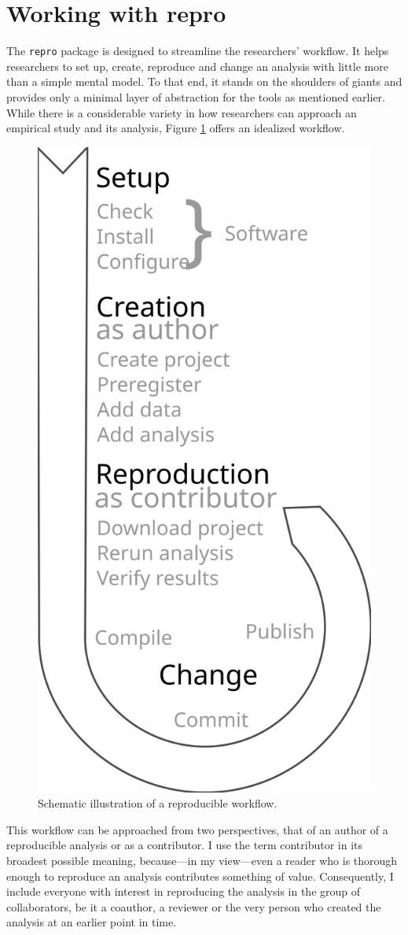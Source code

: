 \documentclass[12pt,a4paper,twoside]{article}
\begin{document}
\hypertarget{working-with-repro}{%
\section{Working with repro}\label{working-with-repro}}

The \texttt{repro} package is designed to streamline the researchers' workflow.
It helps researchers to set up, create, reproduce and change an analysis with little more than a simple mental model.
To that end, it stands on the shoulders of giants and provides only a minimal layer of abstraction for the tools as mentioned earlier.
While there is a considerable variety in how researchers can approach an empirical study and its analysis, Figure \ref{fig:workflow} offers an idealized workflow.

\begin{figure}

{\centering \includegraphics[width=0.5\linewidth]{images/idealized-workflow} 

}

\caption{Schematic illustration of a reproducible workflow.  }\label{fig:workflow}
\end{figure}

This workflow can be approached from two perspectives, that of an author of a reproducible analysis or as a contributor.
I use the term contributor in its broadest possible meaning, because---in my view---even a reader who is thorough enough to reproduce an analysis contributes something of value.
Consequently, I include everyone with interest in reproducing the analysis in the group of collaborators, be it a coauthor, a reviewer or the very person who created the analysis at an earlier point in time.
\end{document}
